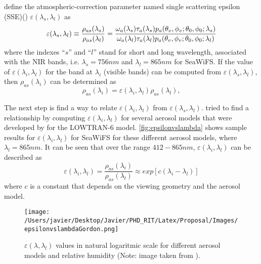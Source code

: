 \cite{Gordon:1994} define the atmospheric-correction parameter named single scattering epsilon (SSE)(\cite{IOCCG:2010}) $\varepsilon(\lambda_s,\lambda_l)$ as
\begin{equation}\label{eq:espilon}
  \varepsilon(\lambda_s,\lambda_l) \equiv \frac{\rho_{as}(\lambda_s)}{\rho_{as}(\lambda_l)} = \\
  \frac{\omega_a(\lambda_s)\tau_a(\lambda_s)p_a(\theta_v,\phi_v;\theta_0,\phi_0;\lambda_s)}{\omega_a(\lambda_l)\tau_a(\lambda_l)p_a(\theta_v,\phi_v;\theta_0,\phi_0;\lambda_l)}
\end{equation}
where the indexes ``$s$'' and ``$l$'' stand for short and long wavelength, associated with the NIR bands, i.e. $\lambda_s=756nm$ and $\lambda_l=865nm$ for SeaWiFS. If the value of $\varepsilon(\lambda_i,\lambda_l)$ for the band at $\lambda_i$ (visible bands) can be computed from $\varepsilon(\lambda_s,\lambda_l)$, then $\rho_{as}(\lambda_i)$ can be determined as
\begin{equation}\label{eq:rholambda_i}
  \rho_{as}(\lambda_i) = \varepsilon(\lambda_i,\lambda_l)\rho_{as}(\lambda_l),
\end{equation}

The next step is find a way to relate $\varepsilon(\lambda_i,\lambda_l)$ from $\varepsilon(\lambda_s,\lambda_l)$. \cite{Gordon:1994} tried to find a relationship by computing  $\varepsilon(\lambda_i,\lambda_l)$ for several aerosol models that were developed by \cite{Shettle:1979} for the LOWTRAN-6 model. \autoref{fig:epsilonvslambda} shows sample results for $\varepsilon(\lambda_i,\lambda_l)$ for SeaWiFS for these different aerosol models, where $\lambda_l=865nm$. It can be seen that over the range $412-865nm$, $\varepsilon(\lambda_i,\lambda_l)$ can be described as
\begin{equation}\label{eq:epsilonexp}
  \varepsilon(\lambda_i,\lambda_l) = \frac{\rho_{as}(\lambda_i)}{\rho_{as}(\lambda_l)} \approx exp[c(\lambda_i-\lambda_l)]
\end{equation}
where $c$ is a constant that depends on the viewing geometry and the aerosol model. 

\begin{figure}[htb]
  \centering
  \texttt{[image: /Users/javier/Desktop/Javier/PHD\_RIT/Latex/Proposal/Images/epsilonvslambdaGordon.png]}
  \caption{$\varepsilon(\lambda,\lambda_l)$ values in natural logaritmic scale for different aerosol models and relative humidity (Note: image taken from \cite{Gordon:1997}). \label{fig:epsilonvslambda} } 
\end{figure}

